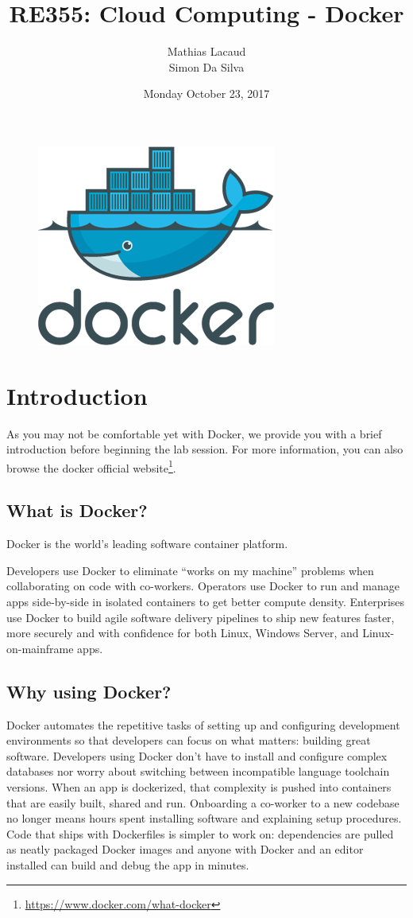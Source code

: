 \documentclass{exam}
\begin{document}
\title{
RE355: Cloud Computing - Docker
}

\author{Mathias Lacaud \\ Simon Da Silva}

\date{Monday October 23, 2017}

\maketitle

\begin{figure}[!htb]
	\centering
	\includegraphics[width=.25\linewidth]{docker.png}
\end{figure}

\section{Introduction}

As you may not be comfortable yet with Docker, we provide you with a brief introduction before beginning the lab session. For more information, you can also browse the docker official website\footnote{\url{https://www.docker.com/what-docker}}.


\subsection{What is Docker?}

Docker is the world’s leading software container platform.

Developers use Docker to eliminate “works on my machine” problems when collaborating on code with co-workers.
Operators use Docker to run and manage apps side-by-side in isolated containers to get better compute density.
Enterprises use Docker to build agile software delivery pipelines to ship new features faster, more securely and with confidence for both Linux, Windows Server, and Linux-on-mainframe apps. 

\subsection{Why using Docker?}

Docker automates the repetitive tasks of setting up and configuring development environments so that developers can focus on what matters: building great software.
Developers using Docker don’t have to install and configure complex databases nor worry about switching between incompatible language toolchain versions.
When an app is dockerized, that complexity is pushed into containers that are easily built, shared and run.
Onboarding a co-worker to a new codebase no longer means hours spent installing software and explaining setup procedures.
Code that ships with Dockerfiles is simpler to work on: dependencies are pulled as neatly packaged Docker images and anyone with Docker and an editor installed can build and debug the app in minutes.
\end{document}
